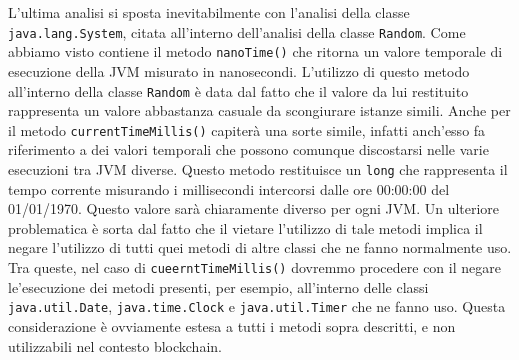 L'ultima analisi si sposta inevitabilmente con l'analisi della classe \lstinline|java.lang.System|, citata all'interno dell'analisi della classe \lstinline|Random|. Come abbiamo visto contiene il metodo \lstinline|nanoTime()| che ritorna un valore temporale di esecuzione della JVM misurato in nanosecondi. L'utilizzo di questo metodo all'interno della classe \lstinline|Random| è data dal fatto che il valore da lui restituito rappresenta un valore abbastanza casuale da scongiurare istanze simili. Anche per il metodo \lstinline|currentTimeMillis()| capiterà una sorte simile, infatti anch'esso fa riferimento a dei valori temporali che possono comunque discostarsi nelle varie esecuzioni tra JVM diverse. Questo metodo restituisce un \lstinline|long| che rappresenta il tempo corrente misurando i millisecondi intercorsi dalle ore 00:00:00 del 01/01/1970. Questo valore sarà chiaramente diverso per ogni JVM. Un ulteriore problematica è sorta dal fatto che il vietare l'utilizzo di tale metodi implica il negare l'utilizzo di tutti quei metodi di altre classi che ne fanno normalmente uso. Tra queste, nel caso di \lstinline|cueerntTimeMillis()| dovremmo procedere con il negare le'esecuzione dei metodi presenti, per esempio, all'interno delle classi \lstinline|java.util.Date|, \lstinline|java.time.Clock| e \lstinline|java.util.Timer| che ne fanno uso. Questa considerazione è ovviamente estesa a tutti i metodi sopra descritti, e non utilizzabili nel contesto blockchain.